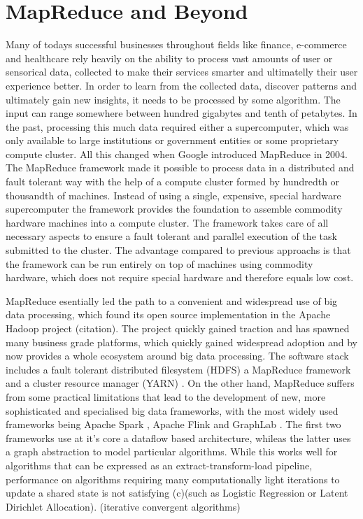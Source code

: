 \section{MapReduce and Beyond}
Many of todays successful businesses throughout fields like finance, e-commerce and healthcare rely heavily on the ability to process vast amounts of user or sensorical data, collected to make their services smarter and ultimatelly their user experience better.
In order to learn from the collected data, discover patterns and ultimately gain new insights, it needs to be processed by some algorithm.
The input can range somewhere between hundred gigabytes and tenth of petabytes.
In the past, processing this much data required either a supercomputer, which was only available to large institutions or government entities or some proprietary compute cluster.
All this changed when Google introduced MapReduce \cite{Dean2004} in 2004.
The MapReduce framework made it possible to process data in a distributed and fault tolerant way with the help of a compute cluster formed by hundredth or thousandth of machines.
Instead of using a single, expensive, special hardware supercomputer the framework provides the foundation to assemble commodity hardware machines into a compute cluster.
The framework takes care of all necessary aspects to ensure a fault tolerant and parallel execution of the task submitted to the cluster.
The advantage compared to previous approachs is that the framework can be run entirely on top of machines using commodity hardware, which does not require special hardware and therefore equals low cost.

MapReduce esentially led the path to a convenient and widespread use of big data processing, which found its open source implementation in the Apache Hadoop project \cite{hadoop2009hadoop} (citation).
The project quickly gained traction and has spawned many business grade platforms, which quickly gained widespread adoption and by now provides a whole ecosystem around big data processing. The software stack includes a fault tolerant distributed filesystem (HDFS) a MapReduce framework and a cluster resource manager (YARN) \cite{KumarVavilapalli2013}.
On the other hand, MapReduce suffers from some practical limitations that lead to the development of new, more sophisticated and specialised big data frameworks, with the most widely used frameworks being Apache Spark \cite{Zaharia2010}, Apache Flink \cite{Alexandrov2014} and GraphLab \cite{Low2012}.
The first two frameworks use at it's core a dataflow based architecture, whileas the latter uses a graph abstraction to model particular algorithms.
While this works well for algorithms that can be expressed as an extract-transform-load pipeline, performance on algorithms requiring many computationally light iterations to update a shared state is not satisfying (c)(such as Logistic Regression or Latent Dirichlet Allocation). (iterative convergent algorithms)


